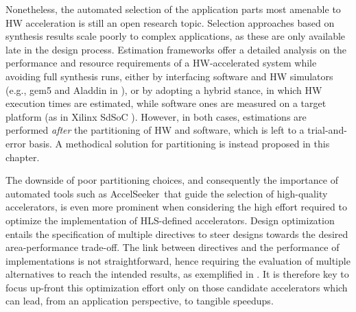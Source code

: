 \documentclass[]{usiinfthesis}
\newcommand{\aseeker}{{AccelSeeker}}
\begin{document}
Nonetheless, the automated selection of the application parts most
amenable to HW acceleration is still an open research topic.
Selection approaches based on synthesis results \cite{CanisSep13b}
scale poorly to complex applications, as these are only available late
in the design process.  Estimation frameworks offer a detailed
analysis on the performance and resource requirements of a
HW-accelerated system while avoiding full synthesis runs, either
by interfacing software and HW simulators (e.g., gem5
\cite{BinkertFeb11} and Aladdin \cite{ShaoJul14} in \cite{ShaoOct16}),
or by adopting a hybrid stance, in which HW execution times are
estimated, while software ones are measured on a target platform (as
in Xilinx SdSoC \cite{KathailFeb16}). However, in both cases,
estimations are performed \emph{after} the partitioning of HW
and software, which is left to a trial-and-error basis.
A methodical solution for partitioning is instead proposed in this
chapter.\par

The downside of poor partitioning choices, and consequently the
importance of automated tools such as \aseeker\ that guide the selection
of high-quality accelerators, is even more prominent when
considering the high effort required to optimize the implementation of
HLS-defined accelerators. Design optimization entails the
specification of multiple directives to steer designs towards the
desired area-performance trade-off. The link between directives and
the performance of implementations is not straightforward, hence
requiring the evaluation of multiple alternatives to reach the
intended results, as exemplified in 
\cite{FerrettiJan18} \cite{FerrettiOct18} \cite{LiuJun13} \cite{PiccolboniSep17} 
\cite{ZacharopoulosJul18}. It is
therefore key to focus up-front this optimization effort only on those
candidate accelerators which can lead, from an application
perspective, to tangible speedups.\par
\end{document}
